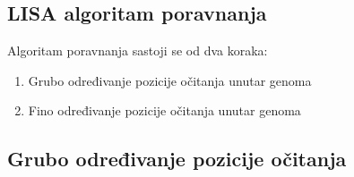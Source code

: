 \documentclass[times, utf8, diplomski]{fer}
\begin{document}
\begin{table}[H]
  \centering
  
  
  \caption{Konceptualni prikaz indeksa}\label{indeks}
\end{table}

\subsection{LISA algoritam poravnanja}
Algoritam poravnanja sastoji se od dva koraka:
\begin{enumerate}
\item Grubo određivanje pozicije očitanja unutar genoma
\item Fino određivanje pozicije očitanja unutar genoma
\end{enumerate}

\subsection{Grubo određivanje pozicije očitanja}
\end{document}
